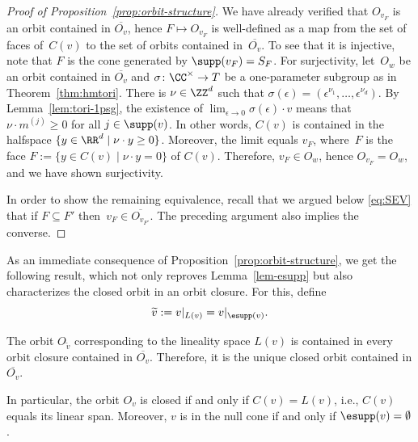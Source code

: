 \begin{proof}[Proof of Proposition~\ref{prop:orbit-structure}]
We have already verified that $O_{v_F}$ is an orbit contained in $\overline{O_v}$, hence $F \mapsto O_{v_F}$ is well-defined as a map from the set of faces of~$C(v)$ to the set of orbits contained in~$\overline{O_v}$.
To see that it is injective, note that $F$ is the cone generated by $\supp(v_F) = S_F$.
For surjectivity, let~$O_w$ be an orbit contained in $\overline{O_v}$ and $\sigma\colon\CC^\times\rightarrow T$ be a one-parameter subgroup as in Theorem~\ref{thm:hmtori}.
There is $\nu\in\ZZ^d$ such that
$\sigma(\epsilon) = (\epsilon^{\nu_1},\ldots,\epsilon^{\nu_d})$.
By Lemma~\ref{lem:tori-1psg}, the existence of $\lim_{\epsilon\to 0}\sigma(\epsilon) \cdot v$ means that $\nu\cdot m^{(j)} \ge 0$ for all $j\in \supp(v)$.
In other words, $C(v)$ is contained in the halfspace
$\{ y\in\RR^d \mid \nu \cdot y \ge 0 \}$.
Moreover, the limit equals $v_F$, where~$F$ is the face
$F := \{ y\in C(v) \mid \nu \cdot y = 0 \}$ of $C(v)$.
Therefore, $v_F \in O_w$, hence $O_{v_F}=O_w$, and we have shown surjectivity.

In order to show the remaining equivalence, recall that we argued below \eqref{eq:SEV} that if $F \subseteq F'$ then~$v_F \in \overline{O_{v_{F'}}}$.
The preceding argument also implies the converse.
\end{proof}

As an immediate consequence of Proposition~\ref{prop:orbit-structure}, we get the following result, which not only reproves Lemma~\ref{lem-esupp} but also characterizes the closed orbit in an orbit closure.
For this, define
\[
  \widetilde{v} := v|_{L(v)} = v|_{\esupp(v)}.
\]
%
%

\begin{corollary}\label{cor:CO}
The orbit $O_{\tilde v}$ corresponding to the lineality space $L(v)$
is contained in every orbit closure contained in $\overline{O_v}$.
Therefore, it is the unique closed orbit contained in $\overline{O_v}$.

In particular, the orbit $O_v$ is closed if and only if $C(v) = L(v)$, i.e., $C(v)$ equals its linear span.
Moreover, $v$ is in the null cone if and only if $\esupp(v) = \emptyset$.
%
\end{corollary}

%
%
